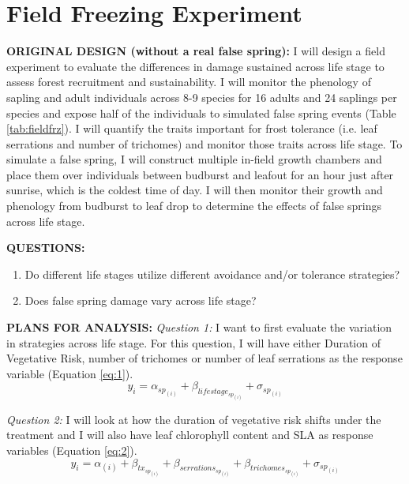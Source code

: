 \documentclass{article}\usepackage[]{graphicx}\usepackage[]{color}
\begin{document}
\renewcommand{\thetable}{\arabic{table}}
\renewcommand{\thefigure}{\arabic{figure}}
\renewcommand{\labelitemi}{$-$}

\renewcommand{\thesection}{\arabic{section}.}
\renewcommand\thesubsection{\arabic{section}.\arabic{subsection}} 

\section*{Field Freezing Experiment}

\textbf{ORIGINAL DESIGN (without a real false spring): } I will design a field experiment to evaluate the differences in damage sustained across life stage to assess forest recruitment and sustainability. I will monitor the phenology of sapling and adult individuals across 8-9 species for 16 adults and 24 saplings per species and expose half of the individuals to simulated false spring events (Table \ref{tab:fieldfrz}). I will quantify the traits important for frost tolerance (i.e. leaf serrations and number of trichomes) and monitor those traits across life stage.  To simulate a false spring, I will construct multiple in-field growth chambers and place them over individuals between budburst and leafout for an hour just after sunrise, which is the coldest time of day. I will then monitor their growth and phenology from budburst to leaf drop to determine the effects of false springs across life stage.

\textbf{QUESTIONS: }
\begin{enumerate}
\item Do different life stages utilize different avoidance and/or tolerance strategies?
\item Does false spring damage vary across life stage?
\end{enumerate}

\textbf{PLANS FOR ANALYSIS: }
\newline
\textit{Question 1: } I want to first evaluate the variation in strategies across life stage. For this question, I will have either Duration of Vegetative Risk, number of trichomes or number of leaf serrations as the response variable (Equation \ref{eq:1}).
\begin{equation} \label{eq:1}
y_i = \alpha_{sp_(i)} + \beta_{lifestage_{sp_{(i)}}} + \sigma_{sp_{(i)}}
\end{equation}

\textit{Question 2: } I will look at how the duration of vegetative risk shifts under the treatment and I will also have leaf chlorophyll content and SLA as response variables (Equation \ref{eq:2}).
\begin{equation} \label{eq:2}
y_i = \alpha_{(i)} + \beta_{tx_{sp_{(i)}}} + \beta_{serrations_{sp_{(i)}}} + \beta_{trichomes_{sp_{(i)}}} + \sigma_{sp_{(i)}}
\end{equation}
\end{document}
